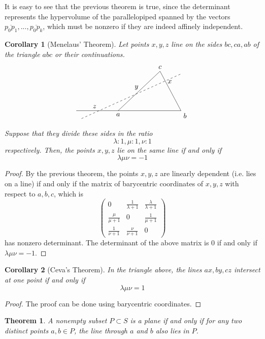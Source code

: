 \documentclass{article}
\newtheorem{theorem}{Theorem}[section]
\newtheorem{corollary}{Corollary}[theorem]
\theoremstyle{remark}
\theoremstyle{definition}
\begin{document}
It is easy to see that the previous theorem is true, since the determinant represents the hypervolume of the parallelopiped spanned by the vectors $\overline{p_0p_1}, ..., \overline{p_0 p_k}$, which must be nonzero if they are indeed affinely independent. 

\begin{corollary}[Menelaus' Theorem]
Let points $x, y, z$ line on the sides $bc, ca, ab$ of the triangle $abc$ or their continuations. 
\[\begin{tikzpicture}[scale=1.3]
    \draw (-1,0)--(3,0)--(2.2, 1.5)--(0.6,0);
    \node[below] at (0.6, 0) {$a$};
    \node[below right] at (3,0) {$b$};
    \node[above] at (2.2, 1.5) {$c$};
    \draw[dashed] (-0.8,-0.3)--(3,1.4);
    \node[above] at (-0.3, 0) {$z$};
    \node[above] at (1.3, 0.7) {$y$};
    \node[right] at (2.4, 1.1) {$x$};
\end{tikzpicture}\]
Suppose that they divide these sides in the ratio 
\[\lambda: 1, \mu: 1, \nu: 1\]
respectively. Then, the points $x, y, z$ lie on the same line if and only if 
\[\lambda \mu \nu = -1\]
\end{corollary}
\begin{proof}
By the previous theorem, the points $x, y, z$ are linearly dependent (i.e. lies on a line) if and only if the matrix of barycentric coordinates of $x, y, z$ with respect to $a, b, c$, which is
\[\begin{pmatrix}
0 & \frac{1}{\lambda + 1} & \frac{\lambda}{\lambda + 1} \\
\frac{\mu}{\mu + 1} & 0 & \frac{1}{\mu + 1} \\
\frac{1}{\nu + 1} & \frac{\nu}{\nu+1} & 0
\end{pmatrix}\]
has nonzero determinant. The determinant of the above matrix is $0$ if and only if $\lambda \mu \nu = -1$. 
\end{proof}

\begin{corollary}[Ceva's Theorem]
In the triangle above, the lines $ax, by, cz$ intersect at one point if and only if 
\[\lambda \mu \nu = 1\]
\end{corollary}
\begin{proof}
The proof can be done using barycentric coordinates. 
\end{proof}

\begin{theorem}
A nonempty subset $P \subset S$ is a plane if and only if for any two distinct points $a, b \in P$, the line through $a$ and $b$ also lies in $P$. 
\end{theorem}
\end{document}
